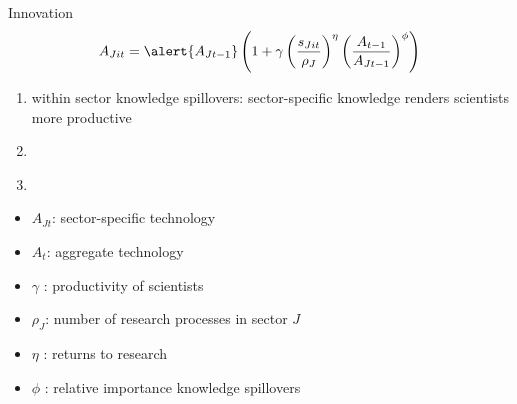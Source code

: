 \documentclass[11pt,aspectratio=169]{beamer}
\begin{document}
\begin{frame}{Innovation}
	\pause
	\vspace{-10mm}
	\vspace{4mm}
	\large
	\begin{align*}
		A_{Jit}=\alert{A_{Jt-1}}\left(1+\gamma\left(\frac{s_{Jit}}{\rho_J}\right)^\eta\left(\frac{A_{t-1}}{A_{Jt-1}}\right)^\phi\right)
	\end{align*}
	\normalsize
	\begin{enumerate}
		\item \alert{within sector knowledge spillovers: sector-specific knowledge renders scientists more productive} %
		\item[] \  %
		\item[] \ %
	\end{enumerate}
	\small
	\vspace{4mm}
	\hspace{-2mm}
	\begin{minipage}[t!]{0.43\textwidth}
		\vspace{0mm}
		\begin{itemize}
			\item[] $A_{Jt}$: sector-specific technology
			\vspace{-2mm}		
			\item[] $A_t$: aggregate technology
			\vspace{-2mm}
			\item[] $\gamma$ : productivity of scientists
		\end{itemize}
	\end{minipage}
	\vspace{-5mm}
	\begin{minipage}[t!]{0.55\textwidth}
		\vspace{0mm}
		\begin{itemize}	
			\item[] $\rho_J$: number of research processes in sector $J$
			\vspace{-2mm}			
			\item[] $\eta$ : returns to research
			\vspace{-2mm}			
			\item[] $\phi$ : relative importance knowledge spillovers
		\end{itemize}
	\end{minipage}
\end{frame}
\end{document}
